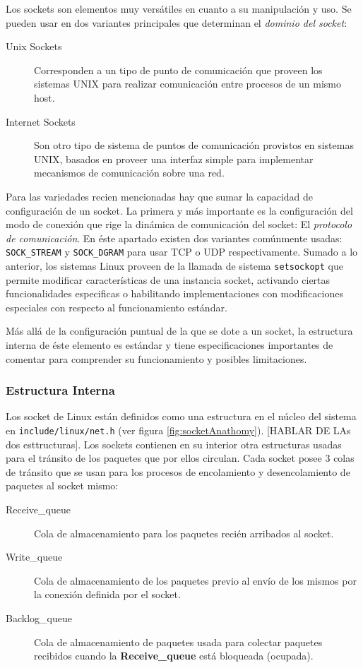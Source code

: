 Los sockets son elementos muy versátiles en cuanto a su manipulación y uso. Se pueden usar en dos variantes principales que determinan el \emph{dominio del socket}:
\begin{description}
\item[Unix Sockets] Corresponden a un tipo de punto de comunicación que proveen los sistemas UNIX para realizar comunicación entre procesos de un mismo host.
\item[Internet Sockets] Son otro tipo de sistema de puntos de comunicación provistos en sistemas UNIX, basados en proveer una interfaz simple para implementar mecanismos de comunicación sobre una red.
\end{description}

Para las variedades recien mencionadas hay que sumar la capacidad de configuración de un socket. La primera y más importante es la configuración del modo de conexión que rige la dinámica de comunicación del socket: El \emph{protocolo de comunicación}. En éste apartado existen dos variantes comúnmente usadas: \verb=SOCK_STREAM= y \verb=SOCK_DGRAM= para usar TCP o UDP respectivamente. Sumado a lo anterior, los sistemas Linux proveen de la llamada de sistema \verb=setsockopt= que permite modificar características de una instancia socket, activando ciertas funcionalidades especificas o habilitando implementaciones con modificaciones especiales con respecto al funcionamiento estándar.

Más allá de la configuración puntual de la que se dote a un socket, la estructura interna de éste elemento es estándar y tiene especificaciones importantes de comentar para comprender su funcionamiento y posibles limitaciones.

\subsubsection{Estructura Interna}
Los socket de Linux están definidos como una estructura en el núcleo del sistema en \verb=include/linux/net.h= (ver figura \ref{fig:socketAnathomy}). [HABLAR DE LAs dos esttructuras]. Los sockets contienen en su interior otra estructuras usadas para el tránsito de los paquetes que por ellos circulan. Cada socket posee 3 colas de tránsito que se usan para los procesos de encolamiento y desencolamiento de paquetes al socket mismo:
\begin{description}
\item[Receive\_queue] Cola de almacenamiento para los paquetes recién arribados al socket.
\item[Write\_queue] Cola de almacenamiento de los paquetes previo al envío de los mismos por la conexión definida por el socket.
\item[Backlog\_queue] Cola de almacenamiento de paquetes usada para colectar paquetes recibidos cuando la \textbf{Receive\_queue} está bloqueada (ocupada).
\end{description}

